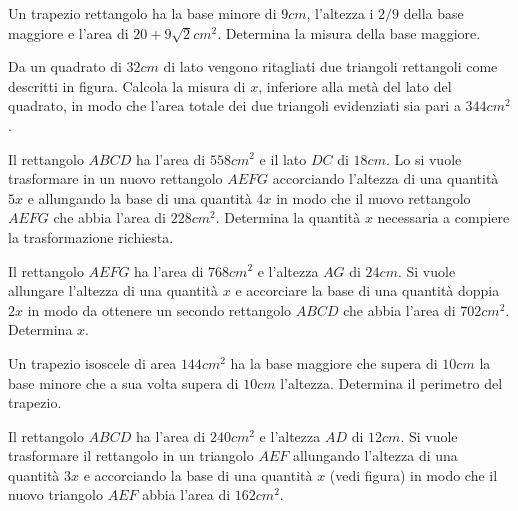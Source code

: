 \begin{multicols}{2}
\begin{esercizio}
 \label{ese:3.160}
Un trapezio rettangolo ha la base minore di $ 9\unit{cm} $, l'altezza i $ 2/9 $ della base
maggiore e l'area di $20 + 9 \sqrt{2}\unit{cm^{2}}$. Determina la misura della base maggiore.
\end{esercizio}

\begin{esercizio}
 \label{ese:3.161}
Da un quadrato di $ 32\unit{cm} $ di lato vengono ritagliati due triangoli rettangoli
come descritti in figura. Calcola la misura di $ x $,
inferiore alla metà del lato del quadrato, in modo che l'area totale dei
due triangoli evidenziati sia pari a $ 344\unit{cm^2} $.
\begin{center}
 
\end{center}
\end{esercizio}

\begin{esercizio}[\Ast]
 \label{ese:3.162}
Il rettangolo $ ABCD $ ha l'area di $ 558\unit{cm^2} $ e il lato $ DC $ di $ 18\unit{cm} $. Lo si
vuole trasformare in un nuovo rettangolo $ AEFG $ accorciando l'altezza di una quantità $ 5x $ e allungando la base di
una quantità $ 4x $ in modo che il nuovo rettangolo $ AEFG $ che abbia l'area di
$ 228\unit{cm^2} $. Determina la quantità $ x $ necessaria a compiere la trasformazione
richiesta.
\end{esercizio}

\begin{esercizio}[\Ast]
 \label{ese:3.163}
Il rettangolo $ AEFG $ ha l'area di $768\unit{cm^2}$ e l'altezza $ AG $ di $ 24\unit{cm} $. Si
vuole allungare l'altezza di una quantità
$ x $ e accorciare la base di una quantità doppia $ 2x $ in modo da ottenere un
secondo rettangolo $ ABCD $ che abbia l'area di $ 702\unit{cm^2} $. Determina $ x $.
\end{esercizio}

\begin{esercizio}
 \label{ese:3.164}
Un trapezio isoscele di area $ 144\unit{cm^2} $ ha la base maggiore che supera di $ 10\unit{cm} $
la base minore che a sua volta supera di $ 10\unit{cm} $ l'altezza. Determina il perimetro del trapezio.
\end{esercizio}

\begin{esercizio}[\Ast]
 \label{ese:3.165}
Il rettangolo $ ABCD $ ha l'area di $ 240\unit{cm^2} $ e l'altezza $ AD $ di $ 12\unit{cm} $. Si
vuole trasformare il rettangolo in un triangolo $ AEF $ allungando l'altezza di una quantità $ 3x $ e accorciando la
base di una quantità $ x $ (vedi figura) in modo che il nuovo triangolo $ AEF $ abbia l'area di $ 162\unit{cm^2} $.
\begin{center}
 
\end{center}
\end{esercizio}


\end{multicols}
